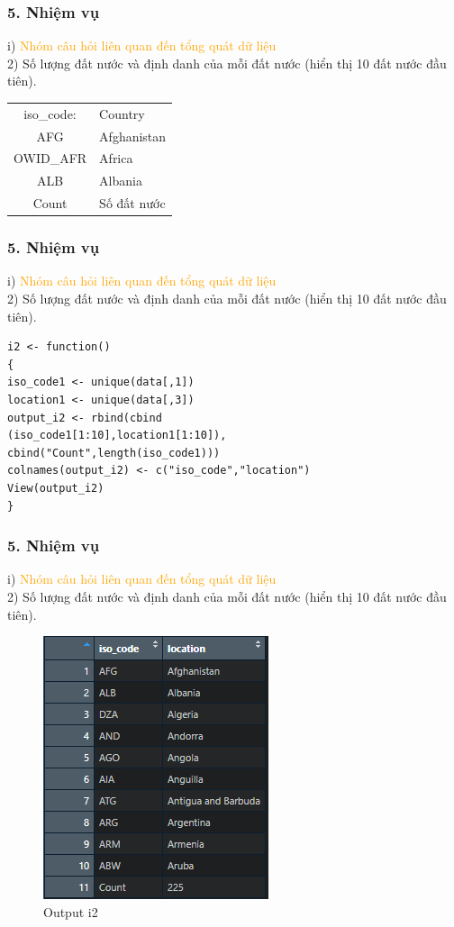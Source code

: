 \documentclass[english,10pt,table]{beamer}
\begin{document}
\begin{frame}[fragile]
\frametitle{5.  Nhiệm vụ}
	i) \textcolor{orange}{Nhóm câu hỏi liên quan đến tổng quát dữ liệu}\\
	2) Số lượng đất nước và định danh của mỗi đất nước (hiển thị 10 đất nước đầu tiên).
		\begin{center}
			\begin{tabular}{ c l }
				iso\_code: & Country \\ 
				AFG & Afghanistan  \\ 
				OWID\_AFR & Africa \\
				ALB & Albania\\ 
				Count & Số đất nước
			\end{tabular}
		\end{center}
\end{frame}

\begin{frame}[fragile]
\frametitle{5.  Nhiệm vụ}
	i) \textcolor{orange}{Nhóm câu hỏi liên quan đến tổng quát dữ liệu}\\
	2) Số lượng đất nước và định danh của mỗi đất nước (hiển thị 10 đất nước đầu tiên).
	\begin{lstlisting}[frame=single]  
i2 <- function()
{
iso_code1 <- unique(data[,1])
location1 <- unique(data[,3])
output_i2 <- rbind(cbind
(iso_code1[1:10],location1[1:10]),
cbind("Count",length(iso_code1)))
colnames(output_i2) <- c("iso_code","location")
View(output_i2)
}
	\end{lstlisting}
\end{frame}

\begin{frame}[fragile]
\frametitle{5.  Nhiệm vụ}
	i) \textcolor{orange}{Nhóm câu hỏi liên quan đến tổng quát dữ liệu}\\
2) Số lượng đất nước và định danh của mỗi đất nước (hiển thị 10 đất nước đầu tiên).
\begin{figure}[h!]
	\begin{center}
		    \includegraphics[scale = 0.5]{Images/I/I2.png}
		            \caption{Output i2}
		\end{center}
		\end{figure}
\end{frame}
\end{document}
